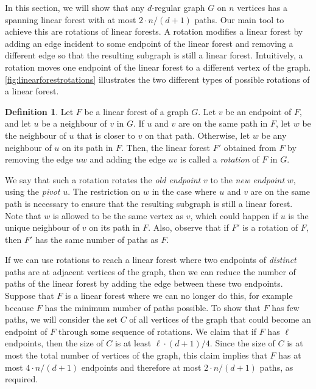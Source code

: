 \documentclass[11pt]{article}
\theoremstyle{plain}
\theoremstyle{definition}
\newtheorem{definition}[theorem]{Definition}
\begin{document}
In this section, we will show that any $d$-regular graph $G$ on $n$ vertices has a spanning linear forest with at most $2 \cdot n/(d+1)$ paths. Our main tool to achieve this are rotations of linear forests. A rotation modifies a linear forest by adding an edge incident to some endpoint of the linear forest and removing a different edge so that the resulting subgraph is still a linear forest. Intuitively, a rotation moves one endpoint of the linear forest to a different vertex of the graph. \cref{fig:linearforestrotations} illustrates the two different types of possible rotations of a linear forest.

\begin{definition}
    Let $F$ be a linear forest of a graph $G$. Let $v$ be an endpoint of $F$, and let $u$ be a neighbour of $v$ in $G$. If $u$ and $v$ are on the same path in $F$, let $w$ be the neighbour of $u$ that is closer to $v$ on that path. Otherwise, let $w$ be any neighbour of $u$ on its path in $F$. Then, the linear forest $F'$ obtained from $F$ by removing the edge $u w$ and adding the edge $u v$ is called a \emph{rotation} of $F$ in $G$.
\end{definition}

We say that such a rotation rotates the \emph{old endpoint} $v$ to the \emph{new endpoint} $w$, using the \emph{pivot} $u$. The restriction on $w$ in the case where $u$ and $v$ are on the same path is necessary to ensure that the resulting subgraph is still a linear forest. Note that $w$ is allowed to be the same vertex as $v$, which could happen if $u$ is the unique neighbour of $v$ on its path in $F$. Also, observe that if $F'$ is a rotation of $F$, then $F'$ has the same number of paths as $F$.

If we can use rotations to reach a linear forest where two endpoints of \emph{distinct} paths are at adjacent vertices of the graph, then we can reduce the number of paths of the linear forest by adding the edge between these two endpoints. Suppose that $F$ is a linear forest where we can no longer do this, for example because $F$ has the minimum number of paths possible. To show that $F$ has few paths, we will consider the set $C$ of all vertices of the graph that could become an endpoint of $F$ through some sequence of rotations. We claim that if $F$ has $\ell$ endpoints, then the size of $C$ is at least $\ell \cdot (d+1)/4$. Since the size of $C$ is at most the total number of vertices of the graph, this claim implies that $F$ has at most $4 \cdot n / (d+1)$ endpoints and therefore at most $2 \cdot n / (d+1)$ paths, as required.
\end{document}
